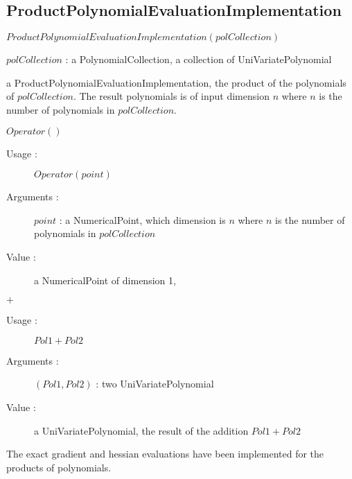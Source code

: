 
\newpage \subsection{ProductPolynomialEvaluationImplementation}

\begin{description}

\item[Usage :] $ProductPolynomialEvaluationImplementation(polCollection)$

\item[Arguments :]  $polCollection$ : a PolynomialCollection, a collection of UniVariatePolynomial

\item[Value :] a ProductPolynomialEvaluationImplementation, the product of the polynomials of $polCollection$. The result polynomials is of input dimension $n$ where $n$ is the number of polynomials in  $polCollection$.

\item[Some methods :]  \rule{0pt}{1em}

\item $Operator()$
  \begin{description}
  \item[Usage :]  $Operator(point)$
  \item[Arguments :] $point$ : a NumericalPoint, which dimension is $n$ where $n$ is the number of polynomials in  $polCollection$
  \item[Value :] a NumericalPoint of dimension 1,
  \end{description}
  \bigskip

\item $+$
  \begin{description}
  \item[Usage :]  $Pol1+Pol2$
  \item[Arguments :] $(Pol1, Pol2)$ : two UniVariatePolynomial
  \item[Value :] a UniVariatePolynomial, the result of the addition  $Pol1+Pol2$
  \end{description}


\item[Details :]  The exact gradient and hessian evaluations have been implemented for the products of polynomials.

\end{description}

